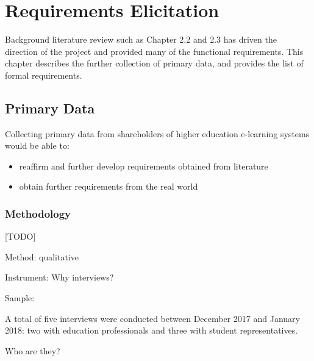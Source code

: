 \chapter{Requirements Elicitation}

Background literature review such as Chapter 2.2 and 2.3 has driven the direction of the project and 
provided many of the functional requirements. This chapter describes the further collection of primary 
data, and provides the list of formal requirements.

\section{Primary Data}
Collecting primary data from shareholders of higher education e-learning systems would be able to:
\begin{itemize}
    \item reaffirm and further develop requirements obtained from literature
    \item obtain further requirements from the real world
\end{itemize}

\subsection{Methodology}

[TODO]

Method: qualitative

Instrument: Why interviews?

Sample: 

A total of five interviews were conducted between December 2017 and January 2018: 
two with education professionals and three with student representatives. 

Who are they?

